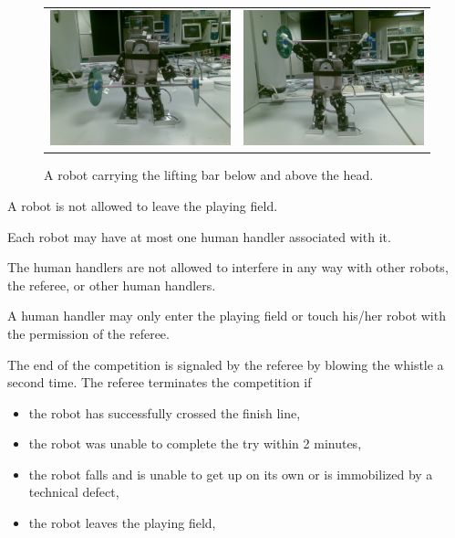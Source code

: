\documentclass[12pt]{hurocup}
\begin{document}
\begin{lawlist}[WL]
\begin{figure}
\begin{center}
\begin{tabular}{cc}
\includegraphics[width=0.4\linewidth]{Figures/weight-lifting1} 
&
\includegraphics[width=0.4\linewidth]{Figures/weight-lifting2} 
\end{tabular}
\caption{A robot carrying the lifting bar below and above the head.}
\label{fig:weight-lifting}
\end{center}
\end{figure}

\item A robot is not allowed to leave the playing field.

\item Each robot may have at most one human handler associated with
  it.

\item \label{lc-handler5} The human handlers are not allowed to
  interfere in any way with other robots, the referee, or other human
  handlers.

\item \label{lc-handler6} A human handler may only enter the playing
 field or touch his/her robot with the permission of the referee.

\item The end of the competition is signaled by the referee by
  blowing the whistle a second time.
  The referee terminates the competition if
  \begin{itemize}
  \item the robot has successfully crossed the finish line,
  \item the robot was unable to complete the try within 2 minutes,
  \item the robot falls and is unable to get up on its own or is
    immobilized by a technical defect, 
  \item the robot leaves the playing field,
  \end{itemize}


\end{lawlist}
\end{document}

